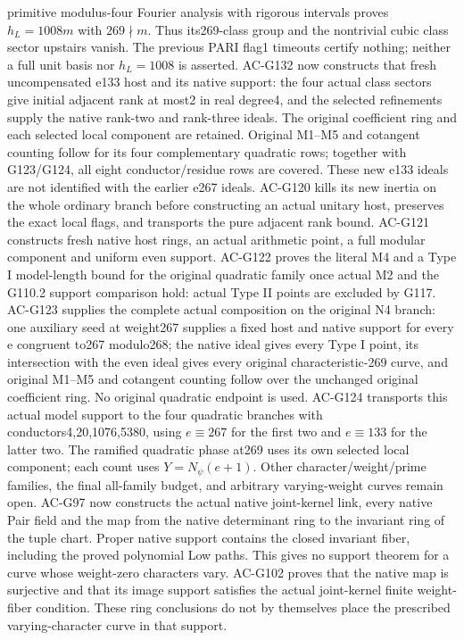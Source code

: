 \documentclass[11pt,a4paper]{article}
\theoremstyle{definition}
\theoremstyle{remark}
\begin{document}
primitive modulus-four Fourier analysis with rigorous intervals proves $h_L=1008m$ with $269\nmid m$. Thus its269-class group and the nontrivial cubic class sector upstairs vanish. The previous PARI flag1 timeouts certify nothing; neither a full unit basis nor $h_L=1008$ is asserted. AC-G132 now constructs that fresh uncompensated e133 host and its native support: the four actual class sectors give initial adjacent rank at most2 in real degree4, and the selected refinements supply the native rank-two and rank-three ideals. The original coefficient ring and each selected local component are retained. Original M1--M5 and cotangent counting follow for its four complementary quadratic rows; together with G123/G124, all eight conductor/residue rows are covered. These new e133 ideals are not identified with the earlier e267 ideals. AC-G120 kills its new inertia on the whole ordinary branch before constructing an actual unitary host, preserves the exact local flags, and transports the pure adjacent rank bound. AC-G121 constructs fresh native host rings, an actual arithmetic point, a full modular component and uniform even support. AC-G122 proves the literal M4 and a Type I model-length bound for the original quadratic family once actual M2 and the G110.2 support comparison hold: actual Type II points are excluded by G117. AC-G123 supplies the complete actual composition on the original N4 branch: one auxiliary seed at weight267 supplies a fixed host and native support for every e congruent to267 modulo268; the native ideal gives every Type I point, its intersection with the even ideal gives every original characteristic-269 curve, and original M1--M5 and cotangent counting follow over the unchanged original coefficient ring. No original quadratic endpoint is used. AC-G124 transports this actual model support to the four quadratic branches with conductors4,20,1076,5380, using $e\equiv267$ for the first two and $e\equiv133$ for the latter two. The ramified quadratic phase at269 uses its own selected local component; each count uses $Y=N_\psi(e+1)$. Other character/weight/prime families, the final all-family budget, and arbitrary varying-weight curves remain open. AC-G97 now constructs the actual
native joint-kernel link, every native Pair field and the map from the
native determinant ring to the invariant ring of the tuple chart.
Proper native support contains the closed invariant fiber, including
the proved polynomial Low paths. This gives no support theorem for
a curve whose weight-zero characters vary. AC-G102 proves that the
native map is surjective and that its image support satisfies the actual
joint-kernel finite weight-fiber condition. These ring conclusions do
not by themselves place the prescribed varying-character curve in that support.
\end{document}
